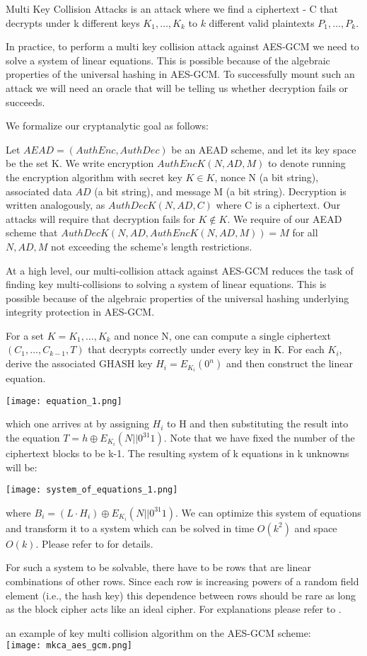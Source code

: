 Multi Key Collision Attacks is an attack where we find a ciphertext - C that decrypts under k different keys $K_{1},\ldots,K_{k}$ to
$k$ different valid plaintexts $P_{1},\ldots,P_{k}$.

In practice, to perform a multi key collision attack against AES-GCM
we need to solve a system of linear equations.
This is possible because of the algebraic properties of the universal hashing in AES-GCM.
To successfully mount such an attack we will need an oracle that will be telling us whether decryption fails or succeeds.

We formalize our cryptanalytic goal as follows:

Let $AEAD = ({AuthEnc},{AuthDec})$ be an AEAD scheme, and let its key space be the set K.
We write encryption ${AuthEncK}(N,{AD},M)$ to denote running the encryption algorithm with secret key $K \in K$,
nonce N (a bit string), associated data ${AD}$ (a bit string), and message M (a bit string).
Decryption is written analogously, as ${AuthDecK}(N,{AD},C)$ where C is a ciphertext.
Our attacks will require that decryption fails for $K \notin K$.
We require of our AEAD scheme that ${AuthDecK}(N,{AD},{AuthEncK}(N,{AD},M)) = M$ for all
$N,{AD},M$ not exceeding the scheme’s length restrictions.


At a high level, our multi-collision attack against AES-GCM reduces the task of finding key multi-collisions to solving
a system of linear equations.
This is possible because of the algebraic properties of the universal hashing underlying
integrity protection in AES-GCM\cite{mg04}.

For a set $K = {K_1,\dots,K_k}$ and nonce N, one can compute a single ciphertext $(C_1,\dots,C_{k-1},T)$
that decrypts correctly under every key in K.
For each $K_i$, derive the associated GHASH key $H_i = E_{K_i}(0^n)$ and then construct the linear equation.

\texttt{[image: equation\_1.png]}

which one arrives at by assigning $H_i$ to H and then substituting the result into the equation
$T = h \oplus E_{K_i}(N || 0^{31}1)$.
Note that we have fixed the number of the
ciphertext blocks to be k-1.
The resulting system of k equations in k unknowns will be:

\texttt{[image: system\_of\_equations\_1.png]}

where $B_i = (L \cdot H_i) \oplus E_{K_i}(N || 0^{31}1)$.
We can optimize this system of equations and transform it to a system which can be solved in time $O(k^2)$ and space $O(k)$.
Please refer to \cite{cryptoeprint:2020:1491} for details.

\hfill \break

For such a system to be solvable, there have to be rows that are linear combinations of other rows.
Since each row is increasing powers of a random field element (i.e., the hash key) this
dependence between rows should be rare as long as the
block cipher acts like an ideal cipher.
For explanations please refer to \cite{cryptoeprint:2020:1491}.

an example of key multi collision algorithm on the AES-GCM scheme:
\\

\texttt{[image: mkca\_aes\_gcm.png]}